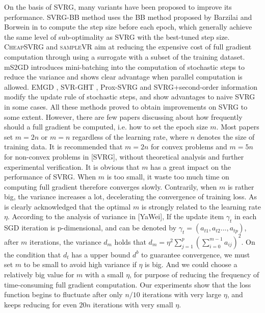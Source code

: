 \documentclass[conference]{IEEEtran}
\begin{document}
On the basis of SVRG, many variants have been proposed to improve its performance.
SVRG-BB \citep{Tan2016Barzilai} method uses the BB method proposed by Barzilai and Borwein in \citep{Barzilai1988Two} to compute the step size before each epoch, which generally achieve the same level of sub-optimality as SVRG with the best-tuned step size.
\textsc{CheapSVRG} \citep{Shah2016Trading} and \textsc{sampleVR} aim at reducing the expensive cost of full gradient computation through using a surrogate with a subset of the training dataset. 
mS2GD \citep{Liu:2015bx} introduces mini-batching into the computation of stochastic steps to reduce the variance and shows clear advantage when parallel computation is allowed. 
EMGD \citep{Zhang2013Linear}, SVR-GHT \citep{Li:2016vh}, Prox-SVRG \citep{Xiao:2014vw} and SVRG+second-order information \citep{KolteAccelerating} modify the update rule of stochastic steps, and show advantages to naive SVRG in some cases.
All these methods proved to obtain improvements on SVRG to some extent. However, there are few papers discussing about how frequently should a full gradient be computed, i.e. how to set the epoch size $m$.
Most papers set $m = 2n$ or $m = n$ regardless of the learning rate, where $n$ denotes the size of training data. It is recommended that $m = 2n$ for convex problems and $m = 5n$ for non-convex problems in [SVRG], without  theoretical analysis and further experimental verification. 
It is obvious that $m$ has a great impact on the performance of SVRG. When $m$ is too small, it waste too much time on computing full gradient therefore converges slowly. Contrarily, when $m$ is rather big, the variance increases a lot, decelerating the convergence of training loss.
As is clearly acknowledged that the optimal $m$ is strongly related to the learning rate $\eta$. 
According to the analysis of variance in [YaWei], If the update item $\gamma_t$ in each SGD iteration is p-dimensional, and can be denoted by $\gamma_t = (a_{t1}, a_{t2}..., a_{tp})$, after $m$ iterations, the variance $d_m$ holds that $d_m \mathrm{=} \eta^2 \sum\limits_{j=1}^p\left(  \sum\limits_{i=0}^{m-1} a_{ij}  \right)^2$. On the condition that $d_t$ has a upper bound $d^b$ to guarantee convergence, we must set $m$ to be small to avoid high variance if $\eta$ is big. And we could choose a relatively big value for $m$ with a small $\eta$, for purpose of reducing the frequency of time-consuming full gradient computation.
Our experiments show that the loss function begins to fluctuate after only $n/10$ iterations with very large $\eta$, and keeps reducing for even $20n$ iterations with very small $\eta$. 
\end{document}
